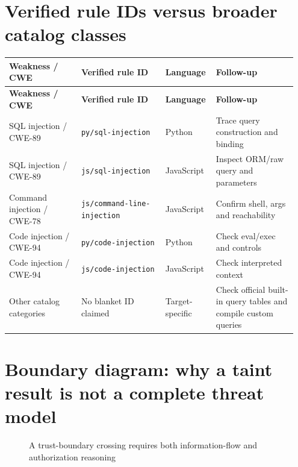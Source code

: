 \documentclass[11pt,letterpaper,oneside]{book}
\begin{document}
\section{Verified rule IDs versus broader catalog classes}

\small
\setlength{\tabcolsep}{2pt}
\renewcommand{\arraystretch}{1.18}
\begin{longtable}{>{\raggedright\arraybackslash}p{0.24\linewidth}>{\raggedright\arraybackslash}p{0.28\linewidth}>{\raggedright\arraybackslash}p{0.16\linewidth}>{\raggedright\arraybackslash}p{0.27\linewidth}}
\toprule
\textbf{Weakness / CWE} & \textbf{Verified rule ID} & \textbf{Language} & \textbf{Follow-up}\\
\midrule
\endfirsthead
\toprule
\textbf{Weakness / CWE} & \textbf{Verified rule ID} & \textbf{Language} & \textbf{Follow-up}\\
\midrule
\endhead
SQL injection / CWE-89 & \texttt{py/sql-injection} & Python & Trace query construction and binding\\
SQL injection / CWE-89 & \texttt{js/sql-injection} & JavaScript & Inspect ORM/raw query and parameters\\
Command injection / CWE-78 & \texttt{js/command-line-injection} & JavaScript & Confirm shell, args and reachability\\
Code injection / CWE-94 & \texttt{py/code-injection} & Python & Check eval/exec and controls\\
Code injection / CWE-94 & \texttt{js/code-injection} & JavaScript & Check interpreted context\\
Other catalog categories & No blanket ID claimed & Target-specific & Check official built-in query tables and compile custom queries\\
\bottomrule
\end{longtable}
\normalsize

\section{Boundary diagram: why a taint result is not a complete threat model}

\begin{figure}[htbp]\centering
{}\caption{A trust-boundary crossing requires both information-flow and authorization reasoning}\end{figure}
\end{document}
